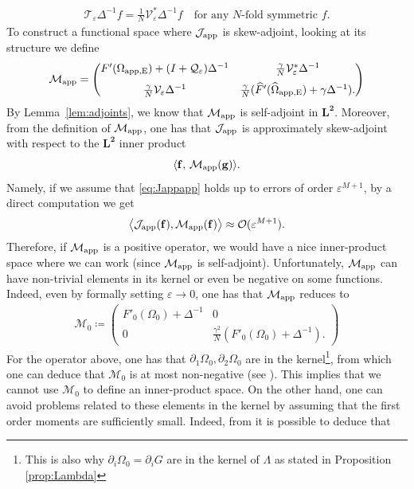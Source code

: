 \documentclass[11pt,reqno,a4paper]{amsart}
\def\eps{\varepsilon}
\def\de{{\partial}}
\newcommand{\cJ}{\mathcal{J}}
\newcommand{\cM}{\mathcal{M}}
\newcommand{\cO}{\mathcal{O}}
\newcommand{\cQ}{\mathcal{Q}}
\newcommand{\cT}{\mathcal{T}}
\newcommand{\cV}{\mathcal{V}}
\newcommand{\app}{\mathrm{app}}
\newcommand{\1}{\mathbbm{1}}
\theoremstyle{definition}
\theoremstyle{definition}
\numberwithin{equation}{section}
\begin{document}
\begin{align}
 \cT_{\eps}\Delta^{-1}f=\frac{1}{N}\cV^*_{\eps}\Delta^{-1}f \quad \text{for any } N\text{-fold symmetric } f.
\end{align}
To construct a functional space where $\cJ_{\rm app}$ is skew-adjoint, looking at its structure  we define 
\begin{align}
\label{def:Happ}
\cM_{\app}=\begin{pmatrix}
       F'(\Omega_{\rm app,E})+(I+\cQ_{\eps})\Delta^{-1}& \frac{\gamma}{N} \cV^*_{\eps}\Delta^{-1}
       \\[6pt]
       \frac{\gamma}{N}\cV_{\eps}\Delta^{-1}
        &\frac{\gamma}{N}(\widehat{F}'(\widehat{\Omega}_{\rm app,E})+\gamma\Delta^{-1}).
\end{pmatrix}
\end{align}
By Lemma~\ref{lem:adjoints}, we know that $\cM_{\rm app}$ 
is self-adjoint in $\mathbf{L^2}$.
Moreover, from the definition of $\cM_{\rm app}$, one has that $\cJ_{\rm app}$ is approximately skew-adjoint with respect to the $\mathbf{L^2}$ inner product $$\langle {\mathbf f},\,\cM_{\rm app}({\mathbf g})\rangle.$$ 
Namely, if we assume that \cref{eq:Jappapp} holds up to errors of order $\eps^{M+1}$, by a direct computation we get
\begin{align}
\label{heuristic1}
    \big\langle \cJ_{\rm app}({\mathbf f}), \cM_\app ({\mathbf f})\big\rangle\approx \cO(\eps^{M+1}).
\end{align}
Therefore, if $\cM_{\rm app}$ is a positive operator, we would have a nice inner-product space where we can work (since $\cM_{\rm app}$ is self-adjoint). Unfortunately, $\cM_{\rm app}$ can have non-trivial elements in its kernel or even be negative on some functions. Indeed, even by formally setting $\eps \to0$, one has that $\cM_{\rm app}$ reduces to
\begin{align}
\label{def:M0}
\cM_0\coloneqq\begin{pmatrix}
       F'_0(\Omega_{0})+\Delta^{-1}& 0
       \\
       0
        &\frac{\gamma^2}{N}(F'_0(\Omega_{0})+\Delta^{-1}).
\end{pmatrix}
\end{align}
For the operator above, one has that $\de_1\Omega_0,\de_2\Omega_0$ are in the kernel\footnote{This is also why $\de_i\Omega_0=\de_iG$ are in the kernel of $\Lambda$ as stated in Proposition \ref{prop:Lambda}}, from which one can deduce that $\cM_0$ is at most non-negative (see \cite{GaSarnold}). This implies that we cannot use $\cM_{0}$ to define an inner-product space. On the other hand, one can avoid problems related to these elements in the kernel by assuming that the first order moments are sufficiently small. Indeed,  from  \cite{GaSarnold} it is possible to deduce that
\end{document}
